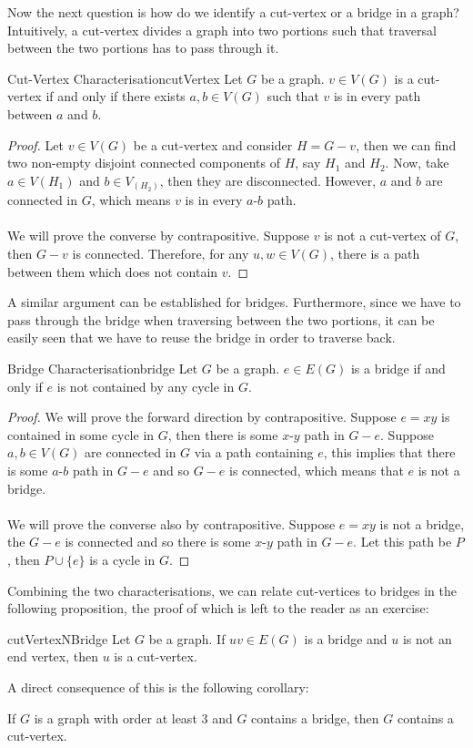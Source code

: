 \documentclass[math]{amznotes}
\theoremstyle{remark}
\begin{document}
Now the next question is how do we identify a cut-vertex or a bridge in a graph? Intuitively, a cut-vertex divides a graph into two portions such that traversal between the two portions has to pass through it.
\begin{thmbox}{Cut-Vertex Characterisation}{cutVertex}
    Let $G$ be a graph. $v \in V(G)$ is a cut-vertex if and only if there exists $a, b \in V(G)$ such that $v$ is in every path between $a$ and $b$.
    \tcblower
    \begin{proof}
        Let $v \in V(G)$ be a cut-vertex and consider $H = G - v$, then we can find two non-empty disjoint connected components of $H$, say $H_1$ and $H_2$. Now, take $a \in V(H_1)$ and $b \in V_(H_2)$, then they are disconnected. However, $a$ and $b$ are connected in $G$, which means $v$ is in every $a$-$b$ path.
        \\\\
        We will prove the converse by contrapositive. Suppose $v$ is not a cut-vertex of $G$, then $G - v$ is connected. Therefore, for any $u, w \in V(G)$, there is a path between them which does not contain $v$.
    \end{proof}
\end{thmbox}
A similar argument can be established for bridges. Furthermore, since we have to pass through the bridge when traversing between the two portions, it can be easily seen that we have to reuse the bridge in order to traverse back.
\begin{thmbox}{Bridge Characterisation}{bridge}
    Let $G$ be a graph. $e \in E(G)$ is a bridge if and only if $e$ is not contained by any cycle in $G$.
    \tcblower
    \begin{proof}
        We will prove the forward direction by contrapositive. Suppose $e = xy$ is contained in some cycle in $G$, then there is some $x$-$y$ path in $G - e$. Suppose $a, b \in V(G)$ are connected in $G$ via a path containing $e$, this implies that there is some $a$-$b$ path in $G - e$ and so $G - e$ is connected, which means that $e$ is not a bridge.
        \\\\
        We will prove the converse also by contrapositive. Suppose $e = xy$ is not a bridge, the $G - e$ is connected and so there is some $x$-$y$ path in $G - e$. Let this path be $P$, then $P \cup \{e\}$ is a cycle in $G$.
    \end{proof}
\end{thmbox}
Combining the two characterisations, we can relate cut-vertices to bridges in the following proposition, the proof of which is left to the reader as an exercise:
\begin{probox}{}{cutVertexNBridge}
    Let $G$ be a graph. If $uv \in E(G)$ is a bridge and $u$ is not an end vertex, then $u$ is a cut-vertex.
\end{probox}
A direct consequence of this is the following corollary:
\begin{corbox}{}{}
    If $G$ is a graph with order at least $3$ and $G$ contains a bridge, then $G$ contains a cut-vertex.
\end{corbox}
\end{document}
